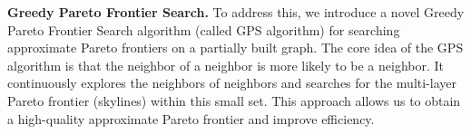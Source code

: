 \noindent\textbf{Greedy Pareto Frontier Search.} %
To address this, we introduce a novel Greedy Pareto Frontier Search algorithm (called GPS algorithm) for searching approximate Pareto frontiers on a partially built graph. The core idea of the GPS algorithm is that the neighbor of a neighbor is more likely to be a neighbor. It continuously explores the neighbors of neighbors and searches for the multi-layer Pareto frontier (skylines) within this small set. This approach allows us to obtain a high-quality approximate Pareto frontier and improve efficiency.

